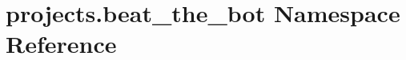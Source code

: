 \hypertarget{namespaceprojects_1_1beat__the__bot}{}\section{projects.\+beat\+\_\+the\+\_\+bot Namespace Reference}
\label{namespaceprojects_1_1beat__the__bot}
